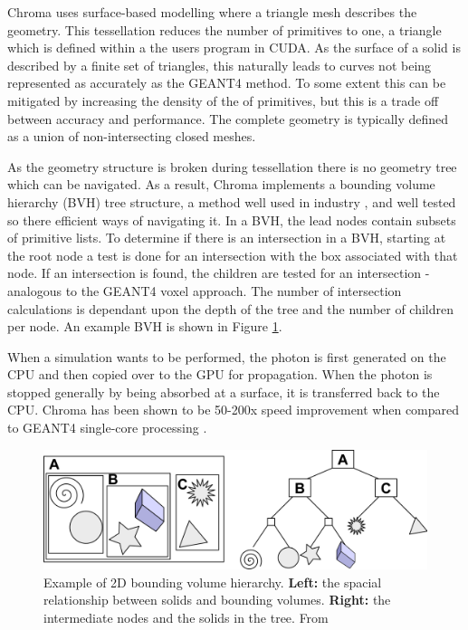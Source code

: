 Chroma uses surface-based modelling where a triangle mesh describes the geometry.
This tessellation reduces the number of primitives to one, a triangle which is defined within a the users program in CUDA.
As the surface of a solid is described by a finite set of triangles, this naturally leads to curves not being represented as accurately as the GEANT4 method.
To some extent this can be mitigated by increasing the density of the of primitives, but this is a trade off between accuracy and performance.
The complete geometry is typically defined as a union of non-intersecting closed meshes.
\par
As the geometry structure is broken during tessellation there is no geometry tree which can be navigated.
As a result, Chroma implements a bounding volume hierarchy (BVH) tree structure, a method well used in industry \cite{real_time_collision_detection_ref}, and well tested so there efficient ways of navigating it.
In a BVH, the lead nodes contain subsets of primitive lists.
To determine if there is an intersection in a BVH, starting at the root node a test is done for an intersection with the box associated with that node.
If an intersection is found, the children are tested for an intersection - analogous to the GEANT4 voxel approach.
The number of intersection calculations is dependant upon the depth of the tree and the number of children per node.
An example BVH is shown in Figure \ref{fig:bvh_example}.
\par
When a simulation wants to be performed, the photon is first generated on the CPU and then copied over to the GPU for propagation.
When the photon is stopped generally by being absorbed at a surface, it is transferred back to the CPU.
Chroma has been shown to be 50-200x speed improvement when compared to GEANT4 single-core processing \cite{chroma_whitepaper_ref,chroma_presentation_ref}.
\begin{figure}[!htbp]
    \centering
    \includegraphics[width=\textwidth]{Figures/Simulations/bounding_volume_hierarchy.png}
    \caption{Example of 2D bounding volume hierarchy. 
             \textbf{Left:} the spacial relationship between solids and bounding volumes.
             \textbf{Right:} the intermediate nodes and the solids in the tree.
             From \cite{bounding_box_ref}}
    \label{fig:bvh_example}
\end{figure}
